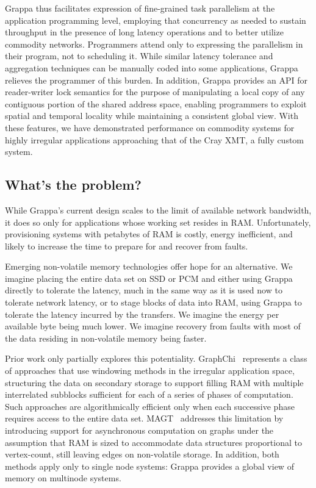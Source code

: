 Grappa thus facilitates
expression of fine-grained task parallelism at the application
programming level, employing that concurrency as needed to sustain throughput in the presence of long latency operations and to better utilize commodity networks.  Programmers attend only to expressing the parallelism in their program, not to scheduling it.  While similar latency
tolerance and aggregation techniques can be manually coded into some
applications, Grappa relieves the programmer of this burden.  In
addition, Grappa provides an API for reader-writer lock semantics for the
purpose of manipulating a local copy of any contiguous portion of the
shared address space, enabling programmers to exploit spatial and
temporal locality while maintaining a consistent global view.  With
these features, we have demonstrated performance on commodity systems
for highly irregular applications approaching that of the Cray XMT, a
fully custom system.

\subsection{What's the problem?}

While Grappa's current design scales to the limit of available network
bandwidth, it does so only for applications whose working set resides
in RAM.  Unfortunately, provisioning systems with petabytes of RAM is
costly, energy inefficient, and likely to increase the time to prepare
for and recover from faults.

Emerging non-volatile memory technologies offer hope for an
alternative.  We imagine placing the entire data set on SSD or PCM and
either using Grappa directly to tolerate the latency, much in the same
way as it is used now to tolerate network latency, or to stage blocks
of data into RAM, using Grappa to tolerate the latency incurred by the
transfers.  We imagine the energy per available byte being much lower.
We imagine recovery from faults with most of the data residing in
non-volatile memory being faster.

Prior work only partially explores this potentiality. GraphChi~\cite{graphchi:osdi12}
represents a class of approaches that use windowing methods in the
irregular application space, structuring the data on secondary storage
to support filling RAM with multiple interrelated subblocks sufficient
for each of a series of phases of computation.  Such approaches are
algorithmically efficient only when each successive phase requires
access to the entire data set.  MAGT~\cite{magt:2010} addresses this limitation by
introducing support for asynchronous computation on graphs under the
assumption that RAM is sized to accommodate data structures
proportional to vertex-count, still leaving edges on non-volatile
storage.  In addition, both methods apply only to single node systems:
Grappa provides a global view of memory on multinode systems.

